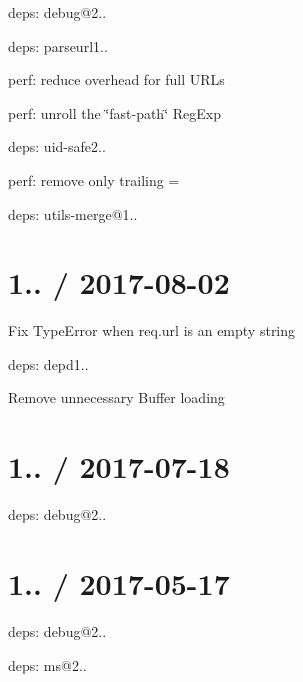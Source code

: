 
\begin{DoxyItemize}
\item deps\+: debug@2..
\item deps\+: parseurl1..
\begin{DoxyItemize}
\item perf\+: reduce overhead for full U\+R\+Ls
\item perf\+: unroll the \char`\"{}fast-\/path\char`\"{} {\ttfamily Reg\+Exp}
\end{DoxyItemize}
\item deps\+: uid-\/safe2..
\begin{DoxyItemize}
\item perf\+: remove only trailing {\ttfamily =}
\end{DoxyItemize}
\item deps\+: utils-\/merge@1..
\end{DoxyItemize}

\section*{1.. / 2017-\/08-\/02 }


\begin{DoxyItemize}
\item Fix {\ttfamily Type\+Error} when {\ttfamily req.\+url} is an empty string
\item deps\+: depd1..
\begin{DoxyItemize}
\item Remove unnecessary {\ttfamily Buffer} loading
\end{DoxyItemize}
\end{DoxyItemize}

\section*{1.. / 2017-\/07-\/18 }


\begin{DoxyItemize}
\item deps\+: debug@2..
\end{DoxyItemize}

\section*{1.. / 2017-\/05-\/17 }


\begin{DoxyItemize}
\item deps\+: debug@2..
\begin{DoxyItemize}
\item deps\+: ms@2..
\end{DoxyItemize}
\end{DoxyItemize}

